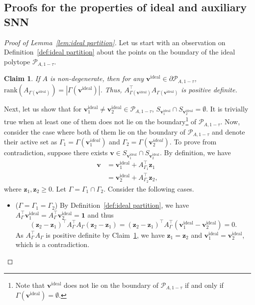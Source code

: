 \documentclass[11pt]{article}
\newtheorem{claim}{Claim}[lemma]
\theoremstyle{remark}
\theoremstyle{definition}
\newcommand{\bz}{\mathbf{z}}
\newcommand{\bv}{\mathbf{v}}
\begin{document}
\subsection{Proofs for the properties of ideal and auxiliary SNN}\label{sec:missing proofs ideal auxiliary SNN}
\begin{proof}[Proof of Lemma~\ref{lem:ideal partition}]
	Let us start with an observation on Definition~\ref{def:ideal partition} about the points on the boundary of  the ideal polytope $\mathcal{P}_{A,1-\tau}$.
	\begin{claim}\label{claim:ideal active PD}
		If $A$ is non-degenerate, then for any $\bv^\text{ideal}\in\partial\mathcal{P}_{A,1-\tau}$, $\text{rank}(A_{\Gamma(\bv^\text{ideal})})=|\Gamma(\bv^\text{ideal})|$. Thus, $A_{\Gamma(\bv^\text{ideal})}^\top A_{\Gamma(\bv^\text{ideal})}$ is positive definite.
	\end{claim}
	
	Next, let us show that for $\bv^\text{ideal}_1\neq\bv^\text{ideal}_2\in\mathcal{P}_{A,1-\tau}$, $S_{\bv^\text{ideal}_1}\cap S_{\bv^\text{ideal}_2}=\emptyset$. It is trivially true when at least one of them does not lie on the boundary\footnote{Note that $\bv^\text{ideal}$ does not lie on the boundary of $\mathcal{P}_{A,1-\tau}$ if and only if $\Gamma(\bv^\text{ideal})=\emptyset$.} of $\mathcal{P}_{A,1-\tau}$. Now, consider the case where both of them lie on the boundary of $\mathcal{P}_{A,1-\tau}$ and denote their active set as $\Gamma_1=\Gamma(\bv^\textit{ideal}_1)$ and $\Gamma_2=\Gamma(\bv^\textit{ideal}_2)$. To prove from contradiction, suppose there exists $\bv\in S_{\bv^\text{ideal}_1}\cap S_{\bv^\text{ideal}_2}$. By definition, we have
	\begin{align*}
	\bv &= \bv^\text{ideal}_1 + A_{\Gamma_1}^\top\bz_1\\
	&=\bv^\text{ideal}_2 + A_{\Gamma_2}^\top\bz_2,
	\end{align*}
	where $\bz_1,\bz_2\geq0$. Let $\Gamma=\Gamma_1\cap\Gamma_2$. Consider the following cases.
	\begin{itemize}
		\item ($\Gamma=\Gamma_1=\Gamma_2$) By Definition~\ref{def:ideal partition}, we have $A_\Gamma^\top\bv^\text{ideal}_1=A_\Gamma^\top\bv^\text{ideal}_2=\mathbf{1}$ and thus
		\begin{equation*}
		(\bz_2-\bz_1)^\top A_\Gamma^\top A_\Gamma(\bz_2-\bz_1)=(\bz_2-\bz_1)^\top A_\Gamma^\top(\bv^\text{ideal}_1-\bv^\text{ideal}_2)=0.
		\end{equation*}
		As $A_\Gamma^\top A_\Gamma$ is positive definite by Claim~\ref{claim:ideal active PD}, we have $\bz_1=\bz_2$ and $\bv^\text{ideal}_1=\bv^\text{ideal}_2$, which is a contradiction.
		

\end{itemize}
\end{proof}
\end{document}
